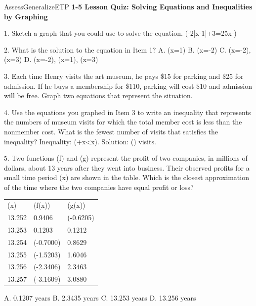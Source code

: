 \documentclass{article}
\newenvironment{te-addendum}[2]{}{}     %
\newcommand{\answer}[1]{}               %
\newcommand{\placeholder}[2]{}          %
\newcommand{\te}[1]{}                   %
\begin{document}
\begin{te-addendum}{Assess}{GeneralizeETP}
\textbf{1-5 Lesson Quiz: Solving Equations and Inequalities by Graphing}
\te{ASSESSMENT RESOURCES. Name blank; enVision Algebra 2; SavvasRealize.com; enVision Algebra 2 Assessment Sourcebook. Lesson Quiz is available at SavvasRealize.com.}
1. Sketch a graph that you could use to solve the equation.
(-2|x-1|+3=\frac25x-)
\placeholder{graph}{Magenta teacher answer graph, unit grid, x,y axes with arrows and labels -4,-2,O,2,4, window [-5,5] on both axes. Inverted V y=-2|x-1|+3 vertex (1,3), rising line y=2x/5-11/5. Intersections (-2,-3) and (3,-1). Curves have arrows at both ends.}
\answer{See graph.}
2. What is the solution to the equation in Item 1?
A. (x=1)
B. (x=-2)
C. (x=-2), (x=3)
D. (x=-2), (x=1), (x=3)
\answer{C}
3. Each time Henry visits the art museum, he pays \$15 for parking and \$25 for admission. If he buys a membership for \$110, parking will cost \$10 and admission will be free. Graph two equations that represent the situation.
\placeholder{graph}{Magenta lines y=40x and y=110+10x, with arrows at upper/right ends, on gray grid with x step 0.5 and y step 25. Axes x Number of visits, y Cost (dollars), origin O, x labels 1 through 5 and y labels 50 through 250. Window roughly x [-1,6], y [-25,275]. Intersection near (3.67,146.67).}
\answer{See graph.}
4. Use the equations you graphed in Item 3 to write an inequality that represents the numbers of museum visits for which the total member cost is less than the nonmember cost. What is the fewest number of visits that satisfies the inequality?
Inequality: (\square+\square x<\square x). Solution: (\square) visits.
\answer{(110+10x<40x); 4 visits}
5. Two functions (f) and (g) represent the profit of two companies, in millions of dollars, about 13 years after they went into business. Their observed profits for a small time period (x) are shown in the table. Which is the closest approximation of the time where the two companies have equal profit or loss?
\begin{tabular}{lll}
(x) & (f(x)) & (g(x)) \\
13.252 & 0.9406 & (-0.6205) \\
13.253 & 0.1203 & 0.1212 \\
13.254 & (-0.7000) & 0.8629 \\
13.255 & (-1.5203) & 1.6046 \\
13.256 & (-2.3406) & 2.3463 \\
13.257 & (-3.1609) & 3.0880 \\
\end{tabular}
A. 0.1207 years
B. 2.3435 years
C. 13.253 years
D. 13.256 years
\answer{C}
\end{te-addendum}
\end{document}
